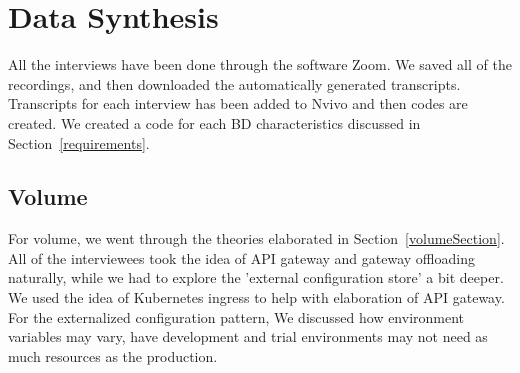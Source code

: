 \documentclass[a4paper,11pt,article,oneside]{memoir}
\begin{document}

      

\section{Data Synthesis}

All the interviews have been done through the software Zoom. We saved all of the recordings, and then downloaded the automatically generated transcripts. Transcripts for each interview has been added to Nvivo and then codes are created. We created a code for each BD characteristics discussed in Section~\ref{requirements}. 


\subsection{Volume}

For volume, we went through the theories elaborated in Section~\ref{volumeSection}. All of the interviewees took the idea of API gateway and gateway offloading naturally, while we had to explore the 'external configuration store' a bit deeper. We used the idea of Kubernetes ingress to help with elaboration of API gateway. For the externalized configuration pattern, We discussed how environment variables may vary, have development and trial environments may not need as much resources as the production.
\end{document}
